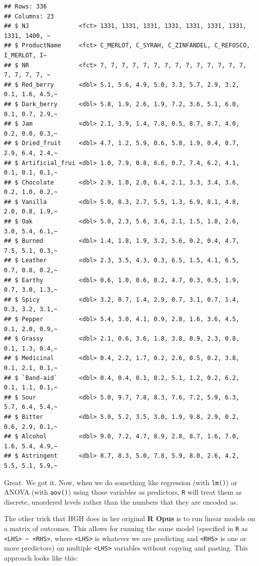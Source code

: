 \documentclass[
]{book}
\begin{document}
\begin{verbatim}
## Rows: 336
## Columns: 23
## $ NJ              <fct> 1331, 1331, 1331, 1331, 1331, 1331, 1331, 1331, 1400, ~
## $ ProductName     <fct> C_MERLOT, C_SYRAH, C_ZINFANDEL, C_REFOSCO, I_MERLOT, I~
## $ NR              <fct> 7, 7, 7, 7, 7, 7, 7, 7, 7, 7, 7, 7, 7, 7, 7, 7, 7, 7, ~
## $ Red_berry       <dbl> 5.1, 5.6, 4.9, 5.0, 3.3, 5.7, 2.9, 3.2, 0.1, 1.6, 4.5,~
## $ Dark_berry      <dbl> 5.8, 1.9, 2.6, 1.9, 7.2, 3.6, 5.1, 6.0, 0.1, 0.7, 2.9,~
## $ Jam             <dbl> 2.1, 3.9, 1.4, 7.8, 0.5, 8.7, 8.7, 4.0, 0.2, 0.0, 0.3,~
## $ Dried_fruit     <dbl> 4.7, 1.2, 5.9, 0.6, 5.8, 1.9, 0.4, 0.7, 2.9, 6.4, 2.4,~
## $ Artificial_frui <dbl> 1.0, 7.9, 0.8, 6.6, 0.7, 7.4, 6.2, 4.1, 0.1, 0.1, 0.1,~
## $ Chocolate       <dbl> 2.9, 1.0, 2.0, 6.4, 2.1, 3.3, 3.4, 3.6, 0.2, 1.0, 0.2,~
## $ Vanilla         <dbl> 5.0, 8.3, 2.7, 5.5, 1.3, 6.9, 8.1, 4.8, 2.0, 0.8, 1.9,~
## $ Oak             <dbl> 5.0, 2.3, 5.6, 3.6, 2.1, 1.5, 1.8, 2.6, 3.0, 5.4, 6.1,~
## $ Burned          <dbl> 1.4, 1.8, 1.9, 3.2, 5.6, 0.2, 0.4, 4.7, 7.5, 5.1, 0.3,~
## $ Leather         <dbl> 2.3, 3.5, 4.3, 0.3, 6.5, 1.5, 4.1, 6.5, 0.7, 0.8, 0.2,~
## $ Earthy          <dbl> 0.6, 1.0, 0.6, 0.2, 4.7, 0.3, 0.5, 1.9, 0.7, 3.0, 1.3,~
## $ Spicy           <dbl> 3.2, 0.7, 1.4, 2.9, 0.7, 3.1, 0.7, 1.4, 0.3, 3.2, 3.1,~
## $ Pepper          <dbl> 5.4, 3.0, 4.1, 0.9, 2.8, 1.6, 3.6, 4.5, 0.1, 2.0, 0.9,~
## $ Grassy          <dbl> 2.1, 0.6, 3.6, 1.8, 3.8, 0.9, 2.3, 0.8, 0.1, 1.3, 0.4,~
## $ Medicinal       <dbl> 0.4, 2.2, 1.7, 0.2, 2.6, 0.5, 0.2, 3.8, 0.1, 2.1, 0.1,~
## $ `Band-aid`      <dbl> 0.4, 0.4, 0.1, 0.2, 5.1, 1.2, 0.2, 6.2, 0.1, 1.1, 0.1,~
## $ Sour            <dbl> 5.0, 9.7, 7.8, 8.3, 7.6, 7.2, 5.9, 6.3, 5.7, 6.4, 5.4,~
## $ Bitter          <dbl> 5.9, 5.2, 3.5, 3.0, 1.9, 9.8, 2.9, 0.2, 0.6, 2.9, 0.1,~
## $ Alcohol         <dbl> 9.0, 7.2, 4.7, 8.9, 2.8, 8.7, 1.6, 7.0, 1.6, 5.4, 4.9,~
## $ Astringent      <dbl> 8.7, 8.3, 5.0, 7.8, 5.9, 8.0, 2.6, 4.2, 5.5, 5.1, 5.9,~
\end{verbatim}

Great. We got it. Now, when we do something like regression (with \texttt{lm()}) or ANOVA (with \texttt{aov()}) using those variables as predictors, \texttt{R} will treat them as discrete, unordered levels rather than the numbers that they are encoded as.

The other trick that HGH does in her original \textbf{R Opus} is to run linear models on a matrix of outcomes. This allows for running the same model (specified in \texttt{R} as \texttt{\textless{}LHS\textgreater{}\ \textasciitilde{}\ \textless{}RHS\textgreater{}}, where \texttt{\textless{}LHS\textgreater{}} is whatever we are predicting and \texttt{\textless{}RHS\textgreater{}} is one or more predictors) on multiple \texttt{\textless{}LHS\textgreater{}} variables without copying and pasting. This approach looks like this:
\end{document}
